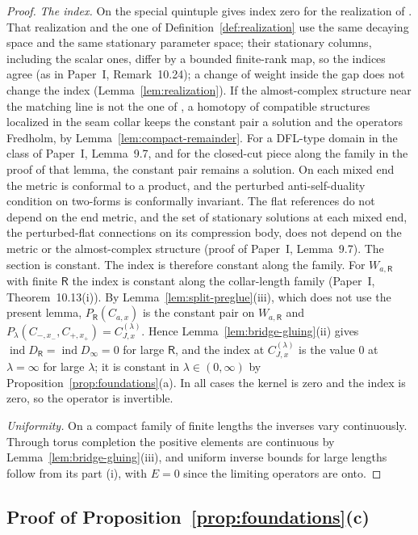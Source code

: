 \documentclass[11pt]{amsart}
\theoremstyle{definition}
\theoremstyle{remark}
\theoremstyle{plain}
\numberwithin{equation}{section}
\newcommand{\ind}{\operatorname{ind}}
\begin{document}
\begin{proof}
\emph{The index.} On the special quintuple \cite[Proposition~3.19]{DFL}
gives index zero for the realization of \cite{DFL}. That realization and
the one of Definition~\ref{def:realization} use the same decaying space and
the same stationary parameter space; their stationary columns, including
the scalar ones, differ by a bounded finite-rank map, so the indices
agree (as in Paper~I, Remark~10.24); a change of
weight inside the gap does not change the index (Lemma~\ref{lem:realization}).
If the almost-complex structure near the matching line is not the one of
\cite{DFL}, a homotopy of compatible structures localized in the seam
collar keeps the constant pair a solution and the operators Fredholm, by
Lemma~\ref{lem:compact-remainder}. For a DFL-type domain in the class of
Paper~I, Lemma~9.7, and for the closed-cut piece along the family in the
proof of that lemma, the constant pair remains a solution. On each mixed
end the metric is conformal to a product, and the perturbed
anti-self-duality condition on two-forms is conformally invariant. The
flat references do not depend on the end metric, and the set of
stationary solutions at each mixed end, the perturbed-flat connections on
its compression body, does not depend on the metric or the almost-complex structure (proof
of Paper~I, Lemma~9.7). The section is constant. The index is
therefore constant along the family. For $W_{a,\mathsf R}$ with finite $\mathsf R$ the index is
constant along the collar-length family (Paper~I, Theorem~10.13(i)). By
Lemma~\ref{lem:split-preglue}(iii), which does not use the present
lemma, $P_{\mathsf R}(C_{a,x})$ is the constant pair on
$W_{a,\mathsf R}$ and $P_\lambda(C_{-,x_-},C_{+,x_+})=C^{(\lambda)}_{J,x}$.
Hence Lemma~\ref{lem:bridge-gluing}(ii) gives $\ind D_{\mathsf R}=\ind D_\infty=0$
for large $\mathsf R$, and the index at $C^{(\lambda)}_{J,x}$ is the value
$0$ at $\lambda=\infty$ for large $\lambda$; it is constant in
$\lambda\in(0,\infty)$ by Proposition~\ref{prop:foundations}(a). In all
cases the kernel is zero and the index is zero, so the operator is
invertible.

\emph{Uniformity.} On a compact family of finite lengths the inverses
vary continuously. Through torus completion the positive elements are
continuous by Lemma~\ref{lem:bridge-gluing}(iii), and uniform inverse
bounds for large lengths follow from its part (i), with $E=0$ since the
limiting operators are onto.
\end{proof}

\subsection{Proof of Proposition~\ref{prop:foundations}(c)}
\end{document}
